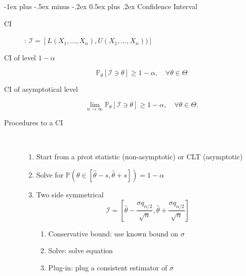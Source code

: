 \documentclass[a4paper, 10pt,landscape]{article}
\makeatletter
\renewcommand{\section}{\@startsection{section}{1}{0mm}%
                                {-1ex plus -.5ex minus -.2ex}%
                                {0.5ex plus .2ex}%
                                {\normalfont\large\bfseries}}
\makeatother
\begin{document}
\begin{multicols*}{4}
\section{Confidence Interval}
	\begin{description}
		\item[CI]: $\mathcal{I} = [L(X_1,...,X_n), U(X_1,...,X_n))]$
		\item[CI of level $1-\alpha$] $$\mathbb{P}_\theta\left[\mathcal{I}\ni\theta\right]\geq1-\alpha,\quad\forall\theta\in\Theta$$
		\item[CI of asymptotical level]  $$\lim\limits_{n\rightarrow\infty}\mathbb{P}_\theta\left[\mathcal{I}\ni\theta\right]\geq1-\alpha,\quad\forall\theta\in\Theta.$$
		\item[Procedures to a CI] ~
			\begin{enumerate}
				\item  Start from a pivot statistic (non-asymptotic) or CLT (asymptotic)
				\item Solve for $\mathbb{P}(\theta \in [\widehat{\theta}-s, \widehat{\theta}+s]) = 1-\alpha$
				\item  Two side symmetrical $$\mathcal{I} = [\widehat{\theta} - \dfrac{\sigma q_{\alpha / 2}}{\sqrt{n}}, \widehat{\theta} + \dfrac{\sigma q_{\alpha / 2}}{\sqrt{n}}]$$
					\begin{enumerate}
						\item Conservative bound: use known bound on $\sigma$
						\item Solve: solve equation
						\item Plug-in: plug a consistent estimator of $\sigma$ 
					\end{enumerate}
			\end{enumerate}
	\end{description}


\end{multicols*}
\end{document}
